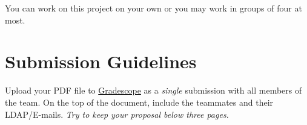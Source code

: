\documentclass[paper=a4, fontsize=11pt]{scrartcl} %
\begin{document}
You can work on this project on your own or you may work in groups of four at most.

\section{Submission Guidelines}

Upload your PDF file to \href{https://www.gradescope.com/courses/1203453}{Gradescope} as a \emph{single} submission with all members of the team. On the top of the document, include the teammates and their LDAP/E-mails. \emph{Try to keep your proposal below three pages.}
\end{document}
